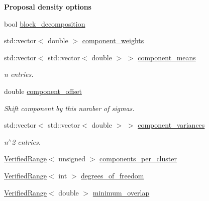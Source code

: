 \begin{Indent}{\bf Proposal density options}\par
{\em \label{_amgrpd9880d82248858d1297ea0d68e4434d4}
 }\begin{DoxyCompactItemize}
\item 
bool \hyperlink{structeos_1_1PopulationMonteCarloSampler_1_1Config_afbe44ab88cfffcf63495463004cdd9b5}{block\_\-decomposition}
\item 
std::vector$<$ double $>$ \hyperlink{structeos_1_1PopulationMonteCarloSampler_1_1Config_a95aeae5fe77255d4fa0c2c5ddfafe883}{component\_\-weights}
\item 
std::vector$<$ std::vector$<$ double $>$ $>$ \hyperlink{structeos_1_1PopulationMonteCarloSampler_1_1Config_a5668b999c1f4c6517b9366035571143d}{component\_\-means}
\begin{DoxyCompactList}\small\item\em n entries. \item\end{DoxyCompactList}\item 
double \hyperlink{structeos_1_1PopulationMonteCarloSampler_1_1Config_a91b615db28333d345eae6d8a2ef55fd5}{component\_\-offset}
\begin{DoxyCompactList}\small\item\em Shift component by this number of sigmas. \item\end{DoxyCompactList}\item 
std::vector$<$ std::vector$<$ double $>$ $>$ \hyperlink{structeos_1_1PopulationMonteCarloSampler_1_1Config_af7452d7aaa3b241039b730998cdbabff}{component\_\-variances}
\begin{DoxyCompactList}\small\item\em n$^\wedge$2 entries. \item\end{DoxyCompactList}\item 
\hyperlink{classeos_1_1VerifiedRange}{VerifiedRange}$<$ unsigned $>$ \hyperlink{structeos_1_1PopulationMonteCarloSampler_1_1Config_a46afc1c26737e35c8ea582ffbab80edb}{components\_\-per\_\-cluster}
\item 
\hyperlink{classeos_1_1VerifiedRange}{VerifiedRange}$<$ int $>$ \hyperlink{structeos_1_1PopulationMonteCarloSampler_1_1Config_ad4069f57b2c8b33032680a27b62fd5cf}{degrees\_\-of\_\-freedom}
\item 
\hyperlink{classeos_1_1VerifiedRange}{VerifiedRange}$<$ double $>$ \hyperlink{structeos_1_1PopulationMonteCarloSampler_1_1Config_a32b76214e4175ec4543162d36707ab84}{minimum\_\-overlap}

\end{DoxyCompactItemize}
\end{Indent}
